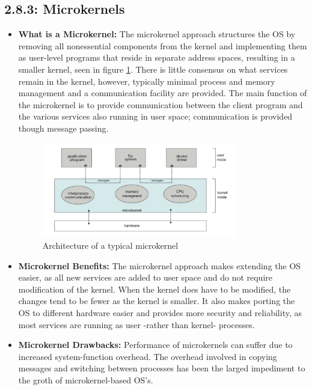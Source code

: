 \documentclass[12pt]{article}
\begin{document}
\subsection*{2.8.3: Microkernels}

\begin{itemize}
    \item \textbf{What is a Microkernel:} The microkernel approach structures the OS by removing all nonessential components from the kernel and implementing them as user-level programs that reside in separate address spaces, resulting in a smaller kernel, seen in figure \ref{fig:microkernel-structure}. There is little consensus on what services remain in the kernel, however, typically minimal process and memory management and a communication facility are provided. The main function of the microkernel is to provide communication between the client program and the various services also running in user space; communication is provided though message passing.
        \begin{figure}[ht]
            \centering
            \includegraphics[width=0.8\textwidth]{figures/microkernel-structure.jpg}
            \caption{Architecture of a typical microkernel}
            \label{fig:microkernel-structure}
        \end{figure}
    \item \textbf{Microkernel Benefits:} The microkernel approach makes extending the OS easier, as all new services are added to user space and do not require modification of the kernel. When the kernel does have to be modified, the changes tend to be fewer as the kernel is smaller. It also makes porting the OS to different hardware easier and provides more security and reliability, as most services are running as user -rather than kernel- processes.
    \item \textbf{Microkernel Drawbacks:} Performance of microkernels can suffer due to increased system-function overhead. The overhead involved in copying messages and switching between processes has been the larged impediment to the groth of microkernel-based OS's.
\end{itemize}
\end{document}
